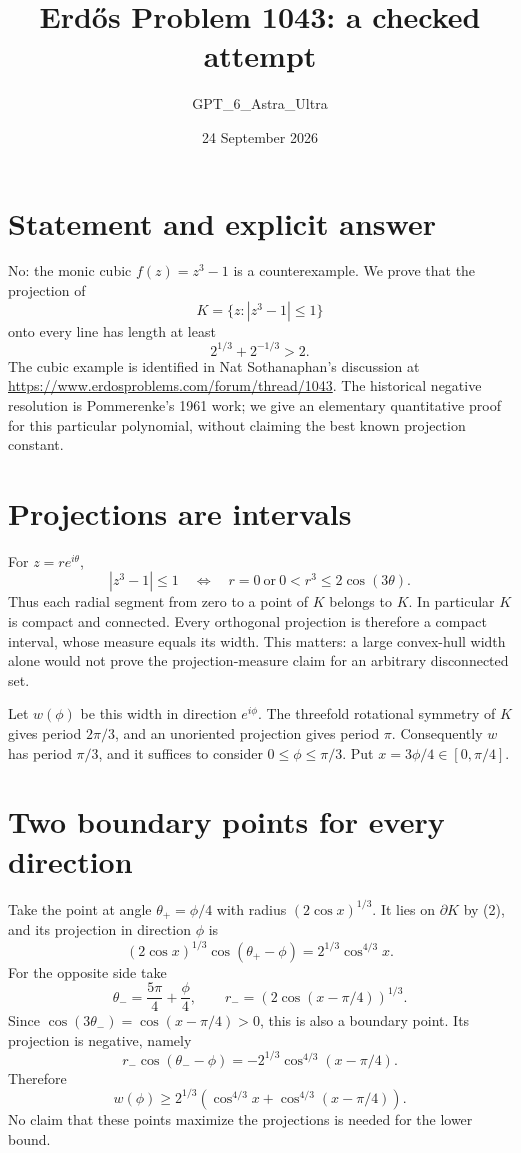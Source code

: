 \documentclass[11pt]{article}
\begin{document}
\title{Erd\H{o}s Problem 1043: a checked attempt}
\author{GPT\_6\_Astra\_Ultra}
\date{24 September 2026}
\maketitle

\section*{Statement and explicit answer}
No: the monic cubic $f(z)=z^3-1$ is a counterexample. We prove that the projection of
\[
 K=\{z:|z^3-1|\le1\}
\]
onto every line has length at least
\[
 2^{1/3}+2^{-1/3}>2. \tag{1}
\]
The cubic example is identified in Nat Sothanaphan's discussion at \url{https://www.erdosproblems.com/forum/thread/1043}. The historical negative resolution is Pommerenke's 1961 work; we give an elementary quantitative proof for this particular polynomial, without claiming the best known projection constant.

\section*{Projections are intervals}
For $z=re^{i\theta}$,
\[
 |z^3-1|\le1\quad\Longleftrightarrow\quad
 r=0\ \text{or}\ 0<r^3\le2\cos(3\theta).
\tag{2}
\]
Thus each radial segment from zero to a point of $K$ belongs to $K$. In particular $K$ is compact and connected. Every orthogonal projection is therefore a compact interval, whose measure equals its width. This matters: a large convex-hull width alone would not prove the projection-measure claim for an arbitrary disconnected set.

Let $w(\phi)$ be this width in direction $e^{i\phi}$. The threefold rotational symmetry of $K$ gives period $2\pi/3$, and an unoriented projection gives period $\pi$. Consequently $w$ has period $\pi/3$, and it suffices to consider $0\le\phi\le\pi/3$. Put $x=3\phi/4\in[0,\pi/4]$.

\section*{Two boundary points for every direction}
Take the point at angle $\theta_+=\phi/4$ with radius $(2\cos x)^{1/3}$. It lies on $\partial K$ by (2), and its projection in direction $\phi$ is
\[
 (2\cos x)^{1/3}\cos(\theta_+-\phi)
 =2^{1/3}\cos^{4/3}x.
\]
For the opposite side take
\[
 \theta_-=\frac{5\pi}{4}+\frac\phi4,
 \qquad r_-=(2\cos(x-\pi/4))^{1/3}.
\]
Since $\cos(3\theta_-)=\cos(x-\pi/4)>0$, this is also a boundary point. Its projection is negative, namely
\[
 r_-\cos(\theta_--\phi)
 =-2^{1/3}\cos^{4/3}(x-\pi/4).
\]
Therefore
\[
 w(\phi)\ge2^{1/3}\left(\cos^{4/3}x+\cos^{4/3}(x-\pi/4)\right). \tag{3}
\]
No claim that these points maximize the projections is needed for the lower bound.
\end{document}
